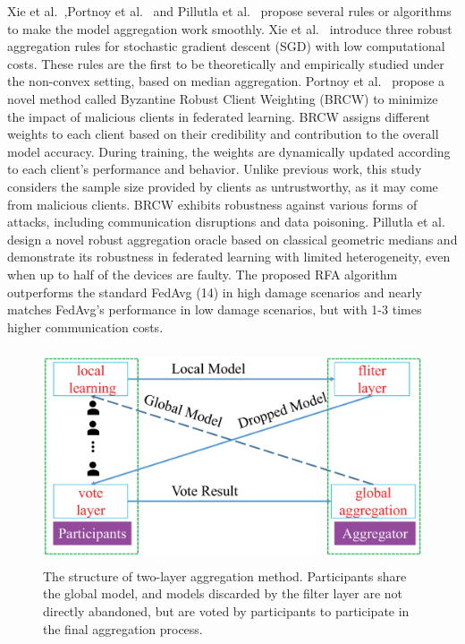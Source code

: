 \documentclass[pdflatex,sn-mathphys-num]{sn-jnl}%
\theoremstyle{thmstyleone}%
\theoremstyle{thmstyletwo}%
\theoremstyle{thmstylethree}%
\begin{document}
Xie et al.~\cite{xie2018generalized},Portnoy et al.~\cite{portnoy2020towards} and Pillutla et
al.~\cite{pillutla2022robust} propose several rules or algorithms to make
the model aggregation work smoothly. Xie et al.~\cite{xie2018generalized}
introduce three robust aggregation rules for stochastic
gradient descent (SGD) with low computational costs.
These rules are the first to be theoretically and empirically
studied under the non-convex setting, based on median
aggregation. Portnoy et al.~\cite{portnoy2020towards} propose a novel method
called Byzantine Robust Client Weighting (BRCW) to
minimize the impact of malicious clients in federated
learning. BRCW assigns different weights to each client
based on their credibility and contribution to the overall
model accuracy. During training, the weights are
dynamically updated according to each client's performance
and behavior. Unlike previous work, this study considers
the sample size provided by clients as untrustworthy,
as it may come from malicious clients. BRCW exhibits
robustness against various forms of attacks, including
communication disruptions and data poisoning. Pillutla
et al.~\cite{pillutla2022robust} design a novel robust aggregation oracle based
on classical geometric medians and demonstrate its
robustness in federated learning with limited heterogeneity, even
when up to half of the devices are faulty. The proposed
RFA algorithm outperforms the standard FedAvg (14)
in high damage scenarios and nearly matches FedAvg's
performance in low damage scenarios, but with 1-3 times
higher communication costs.

\begin{figure}[h]
	\centering
	\includegraphics[width=1.0\linewidth,height=2.5in]{output/fig19.eps}
	\caption{The structure of two-layer aggregation method. Participants
		share the global model, and models discarded by the filter layer are
		not directly abandoned, but are voted by participants to participate
		in the final aggregation process.}
	\label{fig19}
\end{figure}
\end{document}
